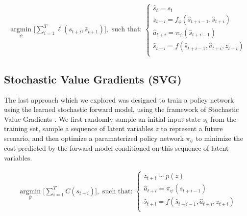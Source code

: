 \documentclass{article} %
\begin{document}
    \begin{align*}
    \underset{\psi}{\mbox{ argmin }} \Big[ \sum_{i=1}^{T} \ell(s_{t+i}, \hat{s}_{t+1}) \Big],  \mbox{ such that: }
    \begin{cases}
      \hat{s}_t = s_t \\
      z_{t+i} = f_\phi(\hat{s}_{t+i-1}, \hat{s}_{t+i}) \\
      \hat{a}_{t+i} = \pi_\psi(\hat{s}_{t+i-1}) \\
      \hat{s}_{t+i} = f(\hat{s}_{t+i-1}, \hat{a}_{t+i}, z_{t+i}) \\
      \end{cases}
  \end{align*}





  \subsection{Stochastic Value Gradients (SVG)}

  The last approach which we explored was designed to train a policy network using the learned stochastic forward model, using the framework of Stochastic Value Gradients \citep{SVG}.
  We first randomly sample an initial input state $s_t$ from the training set, sample a sequence of latent variables $z$ to represent a future scenario, and then optimize a paramaterized policy network $\pi_\psi$ to minimize the cost predicted by the forward model conditioned on this sequence of latent variables.

    \begin{align*}
    \underset{\psi}{\mbox{ argmin }} \Big[ \sum_{i=1}^{T} C(s_{t+i}) \Big],  \mbox{ such that: }
    \begin{cases}
      z_{t+i} \sim p(z) \\
      \hat{a}_{t+i} = \pi_\psi(s_{t+i-1}) \\
      \hat{s}_{t+i} = f(\hat{s}_{t+i-1}, \hat{a}_{t+i}, z_{t+i}) \\
      \end{cases}
    \end{align*}
\end{document}
